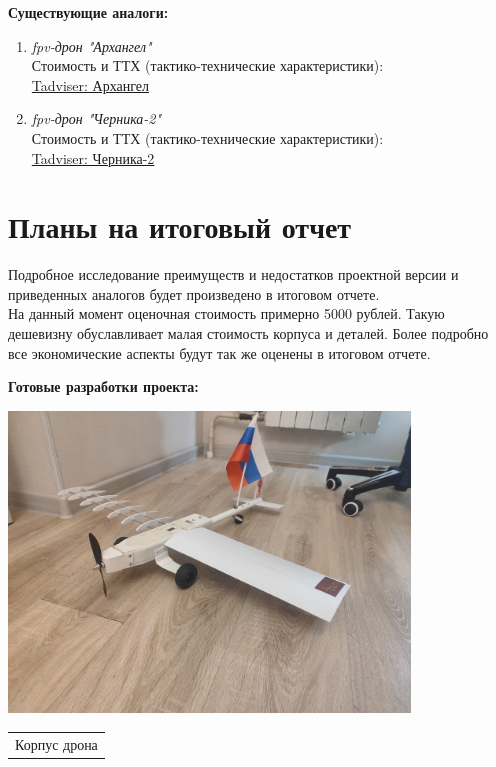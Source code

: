 \documentclass[a4paper,12pt]{article}
\begin{document}
	\textbf{Существующие аналоги:}
	\begin{enumerate}
		\item \textit{fpv-дрон "Архангел"}\\
		Стоимость и ТТХ (тактико-технические характеристики):\\
		\href{https://www.tadviser.ru/index.php/%D0%A1%D1%82%D0%B0%D1%82%D1%8C%D1%8F:%D0%92%D0%BE%D0%B5%D0%BD%D0%BD%D1%8B%D0%B5_%D0%B4%D1%80%D0%BE%D0%BD%D1%8B_%D0%B2_%D0%A0%D0%BE%D1%81%D1%81%D0%B8%D0%B8}{Tadviser: Архангел}
		\item \textit{fpv-дрон "Черника-2"}\\
		Стоимость и ТТХ (тактико-технические характеристики):\\
		\href{https://www.tadviser.ru/index.php/%25D0%25A1%25D1%2582%25D0%25B0%25D1%2582%25D1%258C%25D1%258F:%25D0%2592%25D0%25BE%25D0%25B5%25D0%25BD%25D0%25BD%25D1%258B%25D0%25B5_%25D0%25B4%25D1%2580%25D0%25BE%25D0%25BD%25D1%258B_%25D0%25B2_%25D0%25A0%25D0%25BE%25D1%2581%25D1%2581%25D0%25B8%25D0%25B8}{Tadviser: Черника-2}
		
	\end{enumerate}
	

	\section{Планы на итоговый отчет}
	
	Подробное исследование преимуществ и недостатков проектной версии и приведенных аналогов будет произведено в итоговом отчете. \\
	На данный момент оценочная стоимость примерно 5000 рублей. Такую дешевизну обуславливает малая стоимость корпуса и деталей. Более подробно все экономические аспекты будут так же оценены в итоговом отчете.	

	\vspace{1cm}
	
	\textbf{Готовые разработки проекта:}
	
	\begin{center}
		\includegraphics[width=0.8\textwidth]{main_model.jpg}
		\begin{center}
			\begin{tabular}{c}
				Корпус дрона\\			
			\end{tabular}
		\end{center}
		
	\end{center}
	
\end{document}
